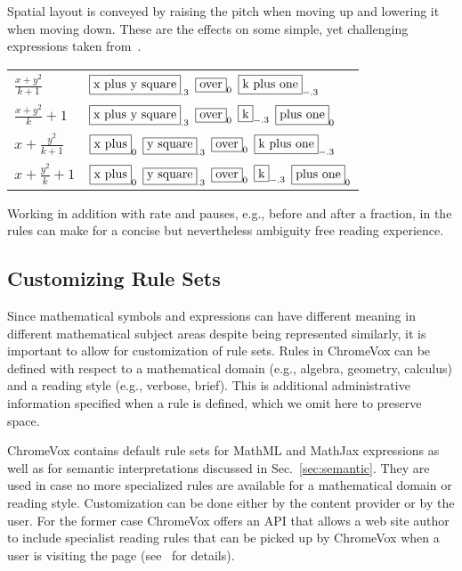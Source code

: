 \documentclass{sig-alternate}
\begin{document}
\noindent 
Spatial layout is conveyed by raising the pitch when moving up and lowering it
when moving down. These are the effects on some simple, yet challenging
expressions taken from~\cite{knuthart}.
\begin{tabular}{lp{}}
  $\frac{x+y^2}{k+1}$ &
  $\framebox{\text{x plus y square}}_{.3}$ 
  $\framebox{\text{over}}_{0}$ 
  $\framebox{\text{k plus one}}_{-.3}$
  \\
  $\frac{x+y^2}{k}+1$ &
  $\framebox{\text{x plus y square}}_{.3}$
  $\framebox{\text{over}}_{0}$
  $\framebox{\text{k}}_{-.3}$
  $\framebox{\text{plus one}}_{0}$
  \\
  $x+\frac{y^2}{k+1}$ &
  $\framebox{\text{x plus}}_{0}$
  $\framebox{\text{y square}}_{.3}$
  $\framebox{\text{over}}_{0}$
  $\framebox{\text{k plus one}}_{-.3}$
  \\
  $x+\frac{y^2}{k}+1$ &
  $\framebox{\text{x plus}}_{0}$
  $\framebox{\text{y square}}_{.3}$
  $\framebox{\text{over}}_{0}$
  $\framebox{\text{k}}_{-.3}$
  $\framebox{\text{plus one}}_{0}$
  \\
\end{tabular}

\noindent Working in addition with rate and pauses, e.g., before and after a
fraction, in the rules can make for a concise but nevertheless ambiguity free
reading experience.




\subsection{Customizing Rule Sets}

Since mathematical symbols and expressions can have different meaning in
different mathematical subject areas despite being represented similarly, it is
important to allow for customization of rule sets. Rules in ChromeVox can be
defined with respect to a mathematical domain (e.g., algebra, geometry,
calculus) and a reading style (e.g., verbose, brief). This is additional
administrative information specified when a rule is defined, which we omit here
to preserve space.

ChromeVox contains default rule sets for MathML and MathJax expressions as well
as for semantic interpretations discussed in Sec.~\ref{sec:semantic}. They are
used in case no more specialized rules are available for a mathematical domain
or reading style.  Customization can be done either by the content provider or
by the user. For the former case ChromeVox offers an API that allows a web site
author to include specialist reading rules that can be picked up by ChromeVox
when a user is visiting the page (see~\cite{Sorge13} for details).
\end{document}
